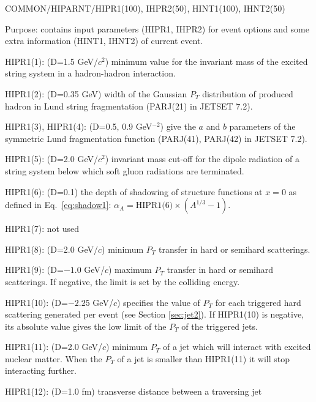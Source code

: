\begin{description}
\itemsep=-4.0pt
\item{}COMMON/HIPARNT/HIPR1(100), IHPR2(50), HINT1(100), IHNT2(50)
\item{}Purpose: contains input parameters (HIPR1, IHPR2) for event options 
                and some extra information (HINT1, IHNT2) of current event.
\item{}HIPR1(1): (D=1.5 GeV/$c^2$) minimum value for the invariant mass of 
                the excited string system in a hadron-hadron interaction.
\item{}HIPR1(2): (D=0.35 GeV) width of the Gaussian $P_T$ distribution of 
                produced hadron in Lund string fragmentation
                (PARJ(21) in JETSET 7.2).
\item{}HIPR1(3), HIPR1(4): (D=0.5, 0.9 GeV$^{-2}$) give the $a$ and $b$ 
                parameters of the symmetric Lund fragmentation function 
                (PARJ(41), PARJ(42) in JETSET 7.2).
\item{}HIPR1(5): (D=2.0 GeV/$c^2$) invariant mass cut-off for the dipole 
                radiation of a string system below which soft gluon
                radiations are terminated.
\item{}HIPR1(6): (D=0.1) the depth of shadowing of structure functions 
                at $x=0$ as defined in Eq.~\ref{eq:shadow1}:
                $\alpha_A=\mbox{HIPR1(6)}\times(A^{1/3}-1)$.
\item{}HIPR1(7): not used
\item{}HIPR1(8): (D=2.0 GeV/$c$) minimum $P_T$ transfer in hard or 
                semihard scatterings.
\item{}HIPR1(9): (D=$-1.0$ GeV/$c$) maximum $P_T$ transfer in hard or 
                semihard scatterings. If negative, the limit is set
                by the colliding energy.
\item{}HIPR1(10): (D=$-2.25$ GeV/$c$) specifies the value of $P_T$ for
                each triggered hard scattering generated per event
                (see Section \ref{sec:jet2}). If HIPR1(10) is negative, 
                its absolute value gives the low limit of the 
                $P_T$ of the triggered jets.  
\item{}HIPR1(11): (D=2.0 GeV/$c$) minimum $P_T$ of a jet which will interact 
                with excited nuclear matter. When the $P_T$ of a jet 
                is smaller than HIPR1(11) it will stop interacting further.
\item{}HIPR1(12): (D=1.0 fm) transverse distance between a traversing jet 

\end{description}
